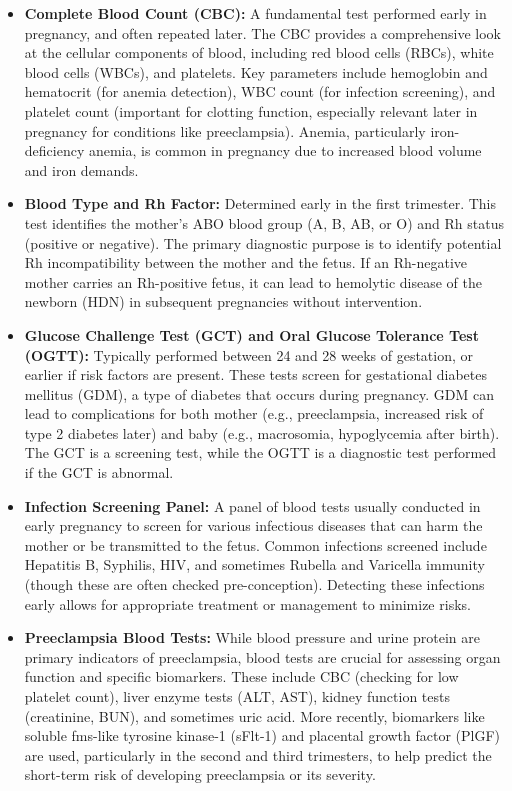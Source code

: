 \documentclass{article}
\begin{document}
\begin{itemize}
    \item \textbf{Complete Blood Count (CBC):} A fundamental test performed early in pregnancy, and often repeated later. The CBC provides a comprehensive look at the cellular components of blood, including red blood cells (RBCs), white blood cells (WBCs), and platelets. Key parameters include hemoglobin and hematocrit (for anemia detection), WBC count (for infection screening), and platelet count (important for clotting function, especially relevant later in pregnancy for conditions like preeclampsia). Anemia, particularly iron-deficiency anemia, is common in pregnancy due to increased blood volume and iron demands.
    \item \textbf{Blood Type and Rh Factor:} Determined early in the first trimester. This test identifies the mother's ABO blood group (A, B, AB, or O) and Rh status (positive or negative). The primary diagnostic purpose is to identify potential Rh incompatibility between the mother and the fetus. If an Rh-negative mother carries an Rh-positive fetus, it can lead to hemolytic disease of the newborn (HDN) in subsequent pregnancies without intervention.
    \item \textbf{Glucose Challenge Test (GCT) and Oral Glucose Tolerance Test (OGTT):} Typically performed between 24 and 28 weeks of gestation, or earlier if risk factors are present. These tests screen for gestational diabetes mellitus (GDM), a type of diabetes that occurs during pregnancy. GDM can lead to complications for both mother (e.g., preeclampsia, increased risk of type 2 diabetes later) and baby (e.g., macrosomia, hypoglycemia after birth). The GCT is a screening test, while the OGTT is a diagnostic test performed if the GCT is abnormal.
    \item \textbf{Infection Screening Panel:} A panel of blood tests usually conducted in early pregnancy to screen for various infectious diseases that can harm the mother or be transmitted to the fetus. Common infections screened include Hepatitis B, Syphilis, HIV, and sometimes Rubella and Varicella immunity (though these are often checked pre-conception). Detecting these infections early allows for appropriate treatment or management to minimize risks.
    \item \textbf{Preeclampsia Blood Tests:} While blood pressure and urine protein are primary indicators of preeclampsia, blood tests are crucial for assessing organ function and specific biomarkers. These include CBC (checking for low platelet count), liver enzyme tests (ALT, AST), kidney function tests (creatinine, BUN), and sometimes uric acid. More recently, biomarkers like soluble fms-like tyrosine kinase-1 (sFlt-1) and placental growth factor (PlGF) are used, particularly in the second and third trimesters, to help predict the short-term risk of developing preeclampsia or its severity.
\end{itemize}
\end{document}
